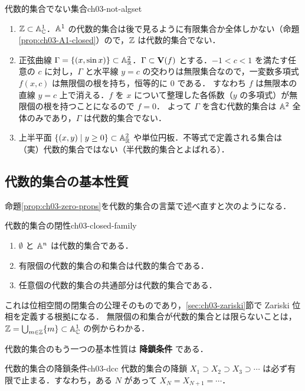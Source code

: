 \begin{myex}{代数的集合でない集合}{ch03-not-algset}
\begin{enumerate}
  \item $\mathbb{Z}\subset\mathbb{A}^1_{\mathbb{C}}$．$\mathbb{A}^1$ の代数的集合は後で見るように有限集合か全体しかない（命題\ref{prop:ch03-A1-closed}）ので，$\mathbb{Z}$ は代数的集合でない．
  \item 正弦曲線 $\Gamma=\{(x,\sin x)\}\subset\mathbb{A}^2_{\mathbb{R}}$．$\Gamma\subset\mathbf{V}(f)$ とする．$-1<c<1$ を満たす任意の $c$ に対し，$\Gamma$ と水平線 $y=c$ の交わりは無限集合なので，一変数多項式 $f(x,c)$ は無限個の根を持ち，恒等的に $0$ である．
        すなわち $f$ は無限本の直線 $y=c$ 上で消える．$f$ を $x$ について整理した各係数（$y$ の多項式）が無限個の根を持つことになるので $f=0$．
        よって $\Gamma$ を含む代数的集合は $\mathbb{A}^2$ 全体のみであり，$\Gamma$ は代数的集合でない．
  \item 上半平面 $\{(x,y)\mid y\ge0\}\subset\mathbb{A}^2_{\mathbb{R}}$ や単位円板．不等式で定義される集合は（実）代数的集合ではない（半代数的集合とよばれる）．
\end{enumerate}
\end{myex}

\subsection{代数的集合の基本性質}

命題\ref{prop:ch03-zero-props}を代数的集合の言葉で述べ直すと次のようになる．

\begin{mythm}{代数的集合の閉性}{ch03-closed-family}
\begin{enumerate}
  \item $\emptyset$ と $\mathbb{A}^n$ は代数的集合である．
  \item 有限個の代数的集合の和集合は代数的集合である．
  \item 任意個の代数的集合の共通部分は代数的集合である．
\end{enumerate}
\end{mythm}

これは位相空間の閉集合の公理そのものであり，\ref{sec:ch03-zariski}節で Zariski 位相を定義する根拠になる．
無限個の和集合が代数的集合とは限らないことは，$\mathbb{Z}=\bigcup_{m\in\mathbb{Z}}\{m\}\subset\mathbb{A}^1_{\mathbb{C}}$ の例からわかる．

代数的集合のもう一つの基本性質は \textbf{降鎖条件} である．

\begin{myprop}{代数的集合の降鎖条件}{ch03-dcc}
代数的集合の降鎖 $X_1\supset X_2\supset X_3\supset\cdots$ は必ず有限で止まる．すなわち，ある $N$ があって $X_N=X_{N+1}=\cdots$．
\end{myprop}

